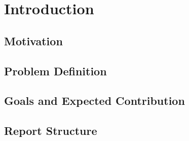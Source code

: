 
%

\chapter{Introduction}
\label{cha:introduction}


\section{Motivation}
\label{sec:Motivation}

\section{Problem Definition}
\label{sec:Problem_Definition}

\section{Goals and Expected Contribution}
\label{sec:Goals_and_Expected_Contribution}

\section{Report Structure}
\label{sec:Report_Structure}